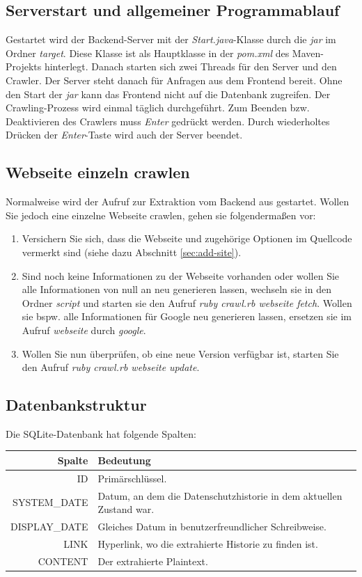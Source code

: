 \documentclass{article}
\begin{document}
	\subsection{Serverstart und allgemeiner Programmablauf}
	Gestartet wird der Backend-Server mit der \textit{Start.java}-Klasse durch die \textit{jar} im  Ordner \textit{target}. Diese Klasse ist als Hauptklasse in der \textit{pom.xml} des Maven-Projekts hinterlegt. Danach starten sich zwei Threads für den Server und den Crawler. Der Server steht danach für Anfragen aus dem Frontend bereit. Ohne den Start der \textit{jar} kann das Frontend nicht auf die Datenbank zugreifen. \newline Der Crawling-Prozess wird einmal täglich durchgeführt. Zum Beenden bzw. Deaktivieren des Crawlers muss \textit{Enter} gedrückt werden. Durch wiederholtes Drücken der \textit{Enter}-Taste wird auch der Server beendet.
	\subsection{Webseite einzeln crawlen}
	Normalweise wird der Aufruf zur Extraktion vom Backend aus gestartet. Wollen Sie jedoch eine einzelne Webseite crawlen, gehen sie folgendermaßen vor:
	\begin{enumerate}
		\item Versichern Sie sich, dass die Webseite und zugehörige Optionen im Quellcode vermerkt sind (siehe dazu Abschnitt \ref{sec:add-site}).
		\item Sind noch keine Informationen zu der Webseite vorhanden oder wollen Sie alle Informationen von null an neu generieren lassen, wechseln sie in den Ordner \textit{script} und starten sie den Aufruf \textit{ruby crawl.rb webseite fetch}. Wollen sie bspw. alle Informationen für Google neu generieren lassen, ersetzen sie im Aufruf \textit{webseite} durch \textit{google}.
		\item Wollen Sie nun überprüfen, ob eine neue Version verfügbar ist, starten Sie den Aufruf \textit{ruby crawl.rb webseite update}.
	\end{enumerate}
	
	\subsection{Datenbankstruktur}
		Die SQLite-Datenbank hat folgende Spalten:
		
		\begin{tabularx}{\textwidth}{|r|X|}
			\hline
			\textbf{Spalte} & \textbf{Bedeutung} \\ \hline \hline
			ID & Primärschlüssel. \\ \hline
			SYSTEM\_DATE & Datum, an dem die Datenschutzhistorie in dem aktuellen Zustand war.\\ \hline
			DISPLAY\_DATE & Gleiches Datum in benutzerfreundlicher Schreibweise. \\ \hline
			LINK & Hyperlink, wo die extrahierte Historie zu finden ist.\\ \hline
			CONTENT & Der extrahierte Plaintext.\\ \hline
		\end{tabularx}
	
\end{document}
